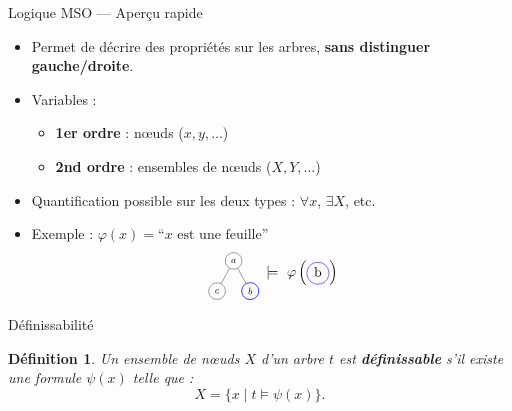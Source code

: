 \documentclass[10pt,xcolor=dvipsnames]{beamer}
\theoremstyle{plain}
\newtheorem{definitionn}[theoreme]{Définition}
\begin{document}
\begin{frame}{Logique MSO — Aperçu rapide}
	\begin{itemize}
		\item Permet de décrire des propriétés sur les arbres, \textbf{sans distinguer gauche/droite}.
		\item Variables :
		      \begin{itemize}
			      \item \textbf{1er ordre} : nœuds ($x, y, \dots$)
			      \item \textbf{2nd ordre} : ensembles de nœuds ($X, Y, \dots$)
		      \end{itemize}
		\item Quantification possible sur les deux types : $\forall x$, $\exists X$, etc.
		\item Exemple : $\varphi(x) = \text{``$x$ est une feuille''}$
		      \[
			      \scalebox{0.7}{
				      \begin{tikzpicture}[sibling distance=1.2cm, level distance=1.1cm,
						      every node/.style = {circle, draw, minimum size=0.6cm}, baseline={(current bounding box.center)}]

					      \node {$a$}
					      child {node {$c$}}
					      child {node[draw=blue, thick] {$b$}};
				      \end{tikzpicture}
			      } \models\ \varphi\left(\tikz[baseline=-0.5ex]\node[draw=blue, circle, inner sep=1pt]{\strut b};\right)
		      \]
	\end{itemize}
\end{frame}

\begin{frame}{Définissabilité}
	\begin{definitionn}
		Un ensemble de nœuds $X$ d’un arbre $t$ est \textbf{définissable} s'il existe une formule $\psi(x)$ telle que :
		\[
			X = \{ x \mid t \models \psi(x) \}.
		\]
	\end{definitionn}
\end{frame}
\end{document}
